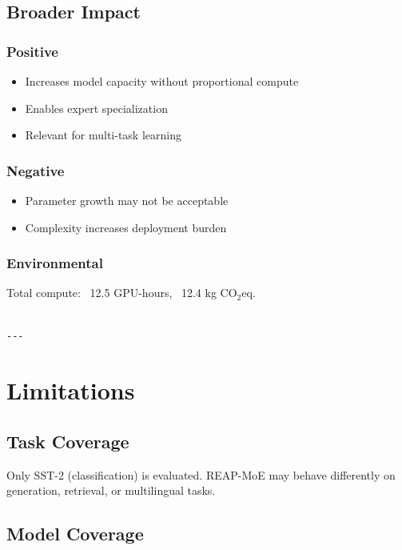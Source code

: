 \subsection{Broader Impact}

\subsubsection{Positive}
\begin{itemize}
\item Increases model capacity without proportional compute
\item Enables expert specialization
\item Relevant for multi-task learning

\end{itemize}
\subsubsection{Negative}
\begin{itemize}
\item Parameter growth may not be acceptable
\item Complexity increases deployment burden

\end{itemize}
\subsubsection{Environmental}
Total compute: ~12.5 GPU-hours, ~12.4 kg CO$_2$eq.
\begin{lstlisting}

---
\end{lstlisting}

\section{Limitations}

\subsection{Task Coverage}

Only SST-2 (classification) is evaluated. REAP-MoE may behave differently 
on generation, retrieval, or multilingual tasks.

\subsection{Model Coverage}

